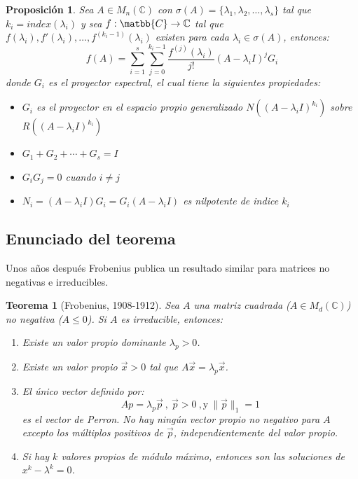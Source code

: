 \documentclass[size=a4, parskip=half, titlepage=false, toc=flat, toc=bib, 12pt]{scrartcl}
\theoremstyle{theorem-style}
\newtheorem{nth}{Teorema}[section]
\newtheorem{nprop}{Proposición}[section]
\theoremstyle{definition-style}
\theoremstyle{remark-style}
\theoremstyle{example-style}
\theoremstyle{definition-style}
\theoremstyle{remark-style}
\begin{document}
\begin{nprop}
\label{radioespectral}
Sea $A \in M_n(\mathbb{C})$ con $\sigma(A) = \{ \lambda_1, \lambda_2, \dots , \lambda_s\}$ tal que $k_i = index(\lambda_i)$ y sea $f:\matbb{C} \rightarrow \mathbb{C}$ tal que $f(\lambda_i), f'(\lambda_i), \dots , f^{(k_i - 1)}(\lambda_i)$ existen para cada $\lambda_i \in \sigma(A)$, entonces:
$$f(A) = \sum_{i = 1}^s \sum_{j = 0}^{k_i -1} \frac{f^{(j)}(\lambda_i)}{j!} (A - \lambda_iI)^j G_i$$
donde $G_i$ es el proyector espectral, el cual tiene la siguientes propiedades:
\begin{itemize}
\item $G_i$ es el proyector en el espacio propio generalizado $N((A - \lambda_i I)^{k_i})$ sobre $R((A - \lambda_i I)^{k_i})$
\item $G_1 + G_2 + \cdots + G_s = I$
\item $G_i G_j = 0$ cuando $i \neq j$
\item $N_i = (A - \lambda_i I)G_i = G_i(A - \lambda_i I)$ es nilpotente de indice $k_i$
\end{itemize}
\end{nprop}

\newpage

\subsection{Enunciado del teorema}

Unos años después Frobenius publica un resultado similar para matrices no negativas e irreducibles.

\begin{nth}[Frobenius, 1908-1912]
Sea $A $ una matriz cuadrada ($A \in M_d(\mathbb{C})$) no negativa ($A \leq 0$). Si $A$ es irreducible, entonces:
\begin{enumerate}
\item Existe un valor propio dominante $\lambda_p > 0$.
\item Existe un valor propio $\vec{x} > 0$ tal que $A\vec{x} = \lambda_p \vec{x}$.
\item El único vector definido por:
$$Ap = \lambda_p \vec{p}  \ , \ \vec{p}> 0 \ , \textrm{y} \ \|\vec{p}\|_1 = 1 $$
es el vector de Perron. No hay ningún vector propio no negativo para $A$ excepto los múltiplos positivos de $\vec{p}$, independientemente del valor propio.
\item Si hay $k$ valores propios de módulo máximo, entonces son las soluciones de $x^k - \lambda^k = 0$.
\end{enumerate}
\end{nth}
\end{document}
